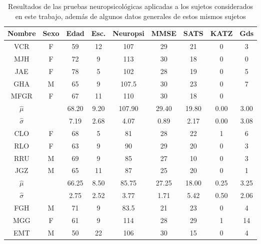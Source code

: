 \begin{table}
\centering
\begin{tabular}{c|ccc|ccccc}
\textbf{Nombre} & \textbf{Sexo} & \textbf{Edad} & \textbf{Esc.} & \textbf{Neuropsi} & \textbf{MMSE} & \textbf{SATS} & \textbf{KATZ} & \textbf{Gds} \\
\hline 
\hline 
VCR    & F    & 59   & 12   & 107      & 29   & 21   & 0    & 3 \\
MJH    & F    & 72   & 9    & 113      & 30   & 18   & 0    & 0 \\
JAE    & F    & 78   & 5    & 102      & 28   & 19   & 0    & 5 \\
GHA    & M    & 65   & 9    & 107.5    & 30   & 23   & 0    & 7 \\
MFGR   & F    & 67   & 11   & 110      & 30   & 18   & 0    &   \\
\hline 
$\widehat{\mu}$ & 
              & 68.20& 9.20 & 107.90   & 29.40& 19.80& 0.00 & 3.00\\
$\widehat{\sigma}$ & 
              & 7.19 & 2.68 & 4.07     & 0.89 & 2.17 & 0.00 & 3.08\\
\hline 
\hline 
CLO    & F    & 68   & 5    & 81       & 28   & 22   & 1    & 6 \\
RLO    & F    & 63   & 9    & 90       & 29   & 20   & 0    & 3 \\
RRU    & M    & 69   & 9    & 85       & 27   & 10   & 0    & 3 \\
JGZ    & M    & 65   & 11   & 87       & 25   & 20   & 0    & 1 \\
\hline 
$\widehat{\mu}$ & 
              & 66.25& 8.50 & 85.75   & 27.25& 18.00& 0.25 & 3.25\\
$\widehat{\sigma}$ & 
              & 2.75 & 2.52 & 3.77    & 1.71 & 5.42 & 0.50 & 2.06\\
\hline 
\hline 
FGH    & M    & 71   & 9    & 83.5     & 21   & 23   & 0    & 4  \\
MGG    & F    & 61   & 9    & 114      & 28   & 29   & 1    & 14 \\
EMT    & M    & 50   & 22   & 106      & 30   & 15   & 0    & 4  \\
\end{tabular} 
\label{tab_sujetos}
\caption{Resultados de las pruebas neuropsicol\'ogicas aplicadas a los sujetos considerados
en este trabajo, adem\'as de algunos datos generales de estos mismos sujetos}
\end{table}


